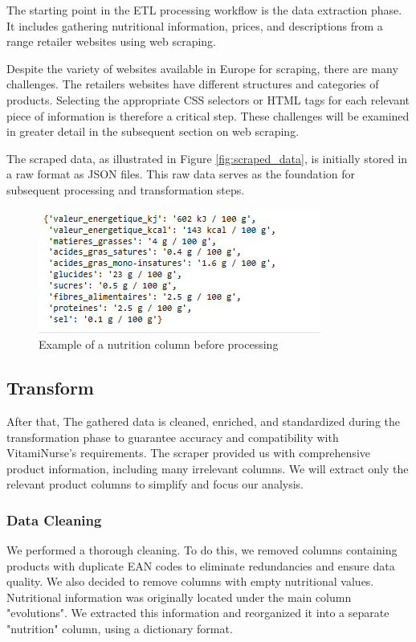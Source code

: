 \par The starting point in the ETL processing workflow is the data extraction phase. It includes gathering nutritional information, prices, and
descriptions from a range retailer websites using web scraping.
\par Despite the variety of websites available in Europe for scraping, there
are many challenges. The retailers websites have different structures and
categories of products. Selecting the appropriate CSS selectors or HTML
tags for each relevant piece of information is therefore a critical step.
These challenges will be examined in greater detail in the subsequent
section on web scraping.
\par The scraped data, as illustrated in Figure \ref{fig:scraped_data}, is initially stored in a raw format as JSON files. This raw data serves as the foundation for subsequent processing and transformation steps.
\begin{center}
\begin{figure}[H]
\centering
\includegraphics[scale=0.66]{images/nutrition.png}
\caption{Example of a nutrition column before processing} 
\label{fig:Nutrition_column}
\end{figure}
\end{center}

\subsection{Transform}
After that, The gathered data is cleaned, enriched, and standardized
during the transformation phase to guarantee accuracy and compatibility with VitamiNurse’s requirements.
The scraper provided us with comprehensive product information, including many irrelevant columns. We will extract only the relevant product columns to simplify and focus our
analysis.

\subsubsection{Data Cleaning}
We performed a thorough cleaning. To do this, we removed columns
containing products with duplicate EAN codes to eliminate redundancies
and ensure data quality. We also decided to remove columns with
empty nutritional values. Nutritional information was originally located
under the main column "evolutions". We extracted this information and
reorganized it into a separate "nutrition" column, using a dictionary
format.


